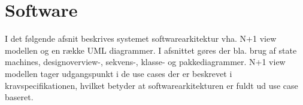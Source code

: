 \chapter{Software}

I det følgende afsnit beskrives systemet softwarearkitektur vha. N+1 view modellen og en række UML diagrammer. I afsnittet gøres der bla. brug af state machines, designoverview-, sekvens-, klasse- og pakkediagrammer. N+1 view modellen tager udgangspunkt i de use cases der er beskrevet i kravspecifikationen, hvilket betyder at softwarearkitekturen er fuldt ud use case baseret.



\newpage


\newpage
%

\newpage
%

\newpage
%


\newpage
%


